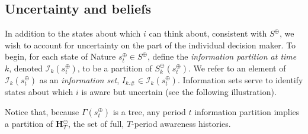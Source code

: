\documentclass[
11pt,
titlepage,
reqno,
]{article}%
\theoremstyle{definition}
\begin{document}
%
	
	
\subsection{Uncertainty and beliefs}

In addition to the states about which $i$ can think about, consistent with $S^\oplus$, we wish to account for uncertainty on the part of the individual decision maker. 
To begin, for each state of Nature $s^\oplus_t\in S^\oplus$, define the\textit{ information partition at time} $k$, denoted $\mathcal{I}_k(s^\oplus_t)$,  to be a partition of $S^\ominus_k(s^\oplus_t)$. 
We refer to an element of $\mathcal{I}_k(s^\oplus_t)$ as an \textit{information set}, $I_{k.\#}\in \mathcal{I}_k(s^\oplus_t)$. 
Information sets serve to identify states about which $i$ is aware but uncertain (see the following illustration).

Notice that, because $\Gamma(s^\oplus_t)$ is a tree, any period $t$ information partition implies a partition of $\mathbf{H}^\ominus_T$, the set of full, $T$-period awareness histories.
\end{document}
